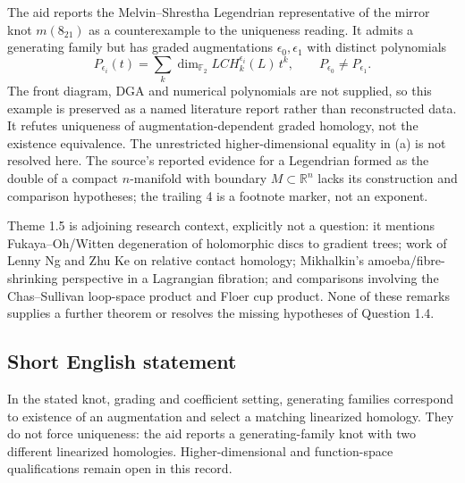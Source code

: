 \documentclass[11pt]{article}
\newcommand{\R}{\mathbb{R}}
\newcommand{\F}{\mathbb{F}}
\begin{document}
The aid reports the Melvin--Shrestha Legendrian representative of the mirror knot \(m(8_{21})\) as a counterexample to the uniqueness reading. It admits a generating family but has graded augmentations \(\epsilon_0,\epsilon_1\) with distinct polynomials
\[
 P_{\epsilon_i}(t)=\sum_k
 \dim_{\F_2}LCH_k^{\epsilon_i}(L)\,t^k,
 \qquad P_{\epsilon_0}\ne P_{\epsilon_1}.
\]
The front diagram, DGA and numerical polynomials are not supplied, so this example is preserved as a named literature report rather than reconstructed data. It refutes uniqueness of augmentation-dependent graded homology, not the existence equivalence. The unrestricted higher-dimensional equality in (a) is not resolved here. The source's reported evidence for a Legendrian formed as the double of a compact \(n\)-manifold with boundary \(M\subset\R^n\) lacks its construction and comparison hypotheses; the trailing 4 is a footnote marker, not an exponent.

Theme 1.5 is adjoining research context, explicitly not a question: it mentions Fukaya--Oh/Witten degeneration of holomorphic discs to gradient trees; work of Lenny Ng and Zhu Ke on relative contact homology; Mikhalkin's amoeba/fibre-shrinking perspective in a Lagrangian fibration; and comparisons involving the Chas--Sullivan loop-space product and Floer cup product. None of these remarks supplies a further theorem or resolves the missing hypotheses of Question 1.4.
\subsection{Short English statement}
In the stated knot, grading and coefficient setting, generating families correspond to existence of an augmentation and select a matching linearized homology. They do not force uniqueness: the aid reports a generating-family knot with two different linearized homologies. Higher-dimensional and function-space qualifications remain open in this record.
\end{document}
